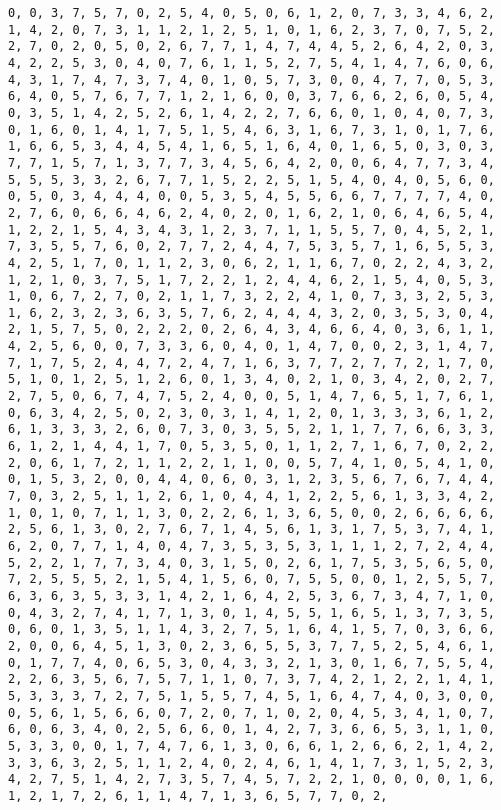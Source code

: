 \documentclass[11pt]{article}
\begin{document}
\begin{Verbatim}[commandchars=\\\{\}]
0, 0, 3, 7, 5, 7, 0, 2, 5, 4, 0, 5, 0, 6, 1, 2, 0, 7, 3, 3, 4, 6, 2, 1, 4, 2, 0, 7, 3, 1, 1, 2, 1, 2, 5, 1, 0, 1, 6, 2, 3, 7, 0, 7, 5, 2, 2, 7, 0, 2, 0, 5, 0, 2, 6, 7, 7, 1, 4, 7, 4, 4, 5, 2, 6, 4, 2, 0, 3, 4, 2, 2, 5, 3, 0, 4, 0, 7, 6, 1, 1, 5, 2, 7, 5, 4, 1, 4, 7, 6, 0, 6, 4, 3, 1, 7, 4, 7, 3, 7, 4, 0, 1, 0, 5, 7, 3, 0, 0, 4, 7, 7, 0, 5, 3, 6, 4, 0, 5, 7, 6, 7, 7, 1, 2, 1, 6, 0, 0, 3, 7, 6, 6, 2, 6, 0, 5, 4, 0, 3, 5, 1, 4, 2, 5, 2, 6, 1, 4, 2, 2, 7, 6, 6, 0, 1, 0, 4, 0, 7, 3, 0, 1, 6, 0, 1, 4, 1, 7, 5, 1, 5, 4, 6, 3, 1, 6, 7, 3, 1, 0, 1, 7, 6, 1, 6, 6, 5, 3, 4, 4, 5, 4, 1, 6, 5, 1, 6, 4, 0, 1, 6, 5, 0, 3, 0, 3, 7, 7, 1, 5, 7, 1, 3, 7, 7, 3, 4, 5, 6, 4, 2, 0, 0, 6, 4, 7, 7, 3, 4, 5, 5, 5, 3, 3, 2, 6, 7, 7, 1, 5, 2, 2, 5, 1, 5, 4, 0, 4, 0, 5, 6, 0, 0, 5, 0, 3, 4, 4, 4, 0, 0, 5, 3, 5, 4, 5, 5, 6, 6, 7, 7, 7, 7, 4, 0, 2, 7, 6, 0, 6, 6, 4, 6, 2, 4, 0, 2, 0, 1, 6, 2, 1, 0, 6, 4, 6, 5, 4, 1, 2, 2, 1, 5, 4, 3, 4, 3, 1, 2, 3, 7, 1, 1, 5, 5, 7, 0, 4, 5, 2, 1, 7, 3, 5, 5, 7, 6, 0, 2, 7, 7, 2, 4, 4, 7, 5, 3, 5, 7, 1, 6, 5, 5, 3, 4, 2, 5, 1, 7, 0, 1, 1, 2, 3, 0, 6, 2, 1, 1, 6, 7, 0, 2, 2, 4, 3, 2, 1, 2, 1, 0, 3, 7, 5, 1, 7, 2, 2, 1, 2, 4, 4, 6, 2, 1, 5, 4, 0, 5, 3, 1, 0, 6, 7, 2, 7, 0, 2, 1, 1, 7, 3, 2, 2, 4, 1, 0, 7, 3, 3, 2, 5, 3, 1, 6, 2, 3, 2, 3, 6, 3, 5, 7, 6, 2, 4, 4, 4, 3, 2, 0, 3, 5, 3, 0, 4, 2, 1, 5, 7, 5, 0, 2, 2, 2, 0, 2, 6, 4, 3, 4, 6, 6, 4, 0, 3, 6, 1, 1, 4, 2, 5, 6, 0, 0, 7, 3, 3, 6, 0, 4, 0, 1, 4, 7, 0, 0, 2, 3, 1, 4, 7, 7, 1, 7, 5, 2, 4, 4, 7, 2, 4, 7, 1, 6, 3, 7, 7, 2, 7, 7, 2, 1, 7, 0, 5, 1, 0, 1, 2, 5, 1, 2, 6, 0, 1, 3, 4, 0, 2, 1, 0, 3, 4, 2, 0, 2, 7, 2, 7, 5, 0, 6, 7, 4, 7, 5, 2, 4, 0, 0, 5, 1, 4, 7, 6, 5, 1, 7, 6, 1, 0, 6, 3, 4, 2, 5, 0, 2, 3, 0, 3, 1, 4, 1, 2, 0, 1, 3, 3, 3, 6, 1, 2, 6, 1, 3, 3, 3, 2, 6, 0, 7, 3, 0, 3, 5, 5, 2, 1, 1, 7, 7, 6, 6, 3, 3, 6, 1, 2, 1, 4, 4, 1, 7, 0, 5, 3, 5, 0, 1, 1, 2, 7, 1, 6, 7, 0, 2, 2, 2, 0, 6, 1, 7, 2, 1, 1, 2, 2, 1, 1, 0, 0, 5, 7, 4, 1, 0, 5, 4, 1, 0, 0, 1, 5, 3, 2, 0, 0, 4, 4, 0, 6, 0, 3, 1, 2, 3, 5, 6, 7, 6, 7, 4, 4, 7, 0, 3, 2, 5, 1, 1, 2, 6, 1, 0, 4, 4, 1, 2, 2, 5, 6, 1, 3, 3, 4, 2, 1, 0, 1, 0, 7, 1, 1, 3, 0, 2, 2, 6, 1, 3, 6, 5, 0, 0, 2, 6, 6, 6, 6, 2, 5, 6, 1, 3, 0, 2, 7, 6, 7, 1, 4, 5, 6, 1, 3, 1, 7, 5, 3, 7, 4, 1, 6, 2, 0, 7, 7, 1, 4, 0, 4, 7, 3, 5, 3, 5, 3, 1, 1, 1, 2, 7, 2, 4, 4, 5, 2, 2, 1, 7, 7, 3, 4, 0, 3, 1, 5, 0, 2, 6, 1, 7, 5, 3, 5, 6, 5, 0, 7, 2, 5, 5, 5, 2, 1, 5, 4, 1, 5, 6, 0, 7, 5, 5, 0, 0, 1, 2, 5, 5, 7, 6, 3, 6, 3, 5, 3, 3, 1, 4, 2, 1, 6, 4, 2, 5, 3, 6, 7, 3, 4, 7, 1, 0, 0, 4, 3, 2, 7, 4, 1, 7, 1, 3, 0, 1, 4, 5, 5, 1, 6, 5, 1, 3, 7, 3, 5, 0, 6, 0, 1, 3, 5, 1, 1, 4, 3, 2, 7, 5, 1, 6, 4, 1, 5, 7, 0, 3, 6, 6, 2, 0, 0, 6, 4, 5, 1, 3, 0, 2, 3, 6, 5, 5, 3, 7, 7, 5, 2, 5, 4, 6, 1, 0, 1, 7, 7, 4, 0, 6, 5, 3, 0, 4, 3, 3, 2, 1, 3, 0, 1, 6, 7, 5, 5, 4, 2, 2, 6, 3, 5, 6, 7, 5, 7, 1, 1, 0, 7, 3, 7, 4, 2, 1, 2, 2, 1, 4, 1, 5, 3, 3, 3, 7, 2, 7, 5, 1, 5, 5, 7, 4, 5, 1, 6, 4, 7, 4, 0, 3, 0, 0, 0, 5, 6, 1, 5, 6, 6, 0, 7, 2, 0, 7, 1, 0, 2, 0, 4, 5, 3, 4, 1, 0, 7, 6, 0, 6, 3, 4, 0, 2, 5, 6, 6, 0, 1, 4, 2, 7, 3, 6, 6, 5, 3, 1, 1, 0, 5, 3, 3, 0, 0, 1, 7, 4, 7, 6, 1, 3, 0, 6, 6, 1, 2, 6, 6, 2, 1, 4, 2, 3, 3, 6, 3, 2, 5, 1, 1, 2, 4, 0, 2, 4, 6, 1, 4, 1, 7, 3, 1, 5, 2, 3, 4, 2, 7, 5, 1, 4, 2, 7, 3, 5, 7, 4, 5, 7, 2, 2, 1, 0, 0, 0, 0, 1, 6, 1, 2, 1, 7, 2, 6, 1, 1, 4, 7, 1, 3, 6, 5, 7, 7, 0, 2, 
\end{Verbatim}
\end{document}
